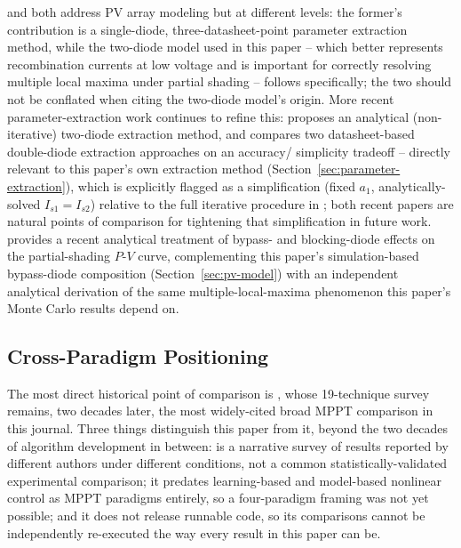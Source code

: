 \cite{villalva2009comprehensive} and \cite{ishaque2011simple} both address
PV array modeling but at different levels: the former's contribution is a
single-diode, three-datasheet-point parameter extraction method, while the
two-diode model used in this paper -- which better represents recombination
currents at low voltage and is important for correctly resolving multiple
local maxima under partial shading -- follows \cite{ishaque2011simple}
specifically; the two should not be conflated when citing the two-diode
model's origin. More recent parameter-extraction work continues to refine
this: \cite{syed2024parameter} proposes an analytical (non-iterative)
two-diode extraction method, and \cite{moshksar2024two} compares two
datasheet-based double-diode extraction approaches on an accuracy/
simplicity tradeoff -- directly relevant to this paper's own extraction
method (Section~\ref{sec:parameter-extraction}), which is explicitly
flagged as a simplification (fixed $a_1$, analytically-solved
$I_{s1}=I_{s2}$) relative to the full iterative procedure in
\cite{ishaque2011simple}; both recent papers are natural points of
comparison for tightening that simplification in future work.
\cite{abad2025analytical} provides a recent analytical treatment of
bypass- and blocking-diode effects on the partial-shading $P$-$V$ curve,
complementing this paper's simulation-based bypass-diode composition
(Section~\ref{sec:pv-model}) with an independent analytical derivation of
the same multiple-local-maxima phenomenon this paper's Monte Carlo results
depend on.

\subsection{Cross-Paradigm Positioning}
The most direct historical point of comparison is
\cite{esram2007comparison}, whose 19-technique survey remains, two decades
later, the most widely-cited broad MPPT comparison in this journal. Three
things distinguish this paper from it, beyond the two decades of algorithm
development in between: \cite{esram2007comparison} is a narrative survey of
results reported by different authors under different conditions, not a
common statistically-validated experimental comparison; it predates
learning-based and model-based nonlinear control as MPPT paradigms
entirely, so a four-paradigm framing was not yet possible; and it does not
release runnable code, so its comparisons cannot be independently
re-executed the way every result in this paper can be.

